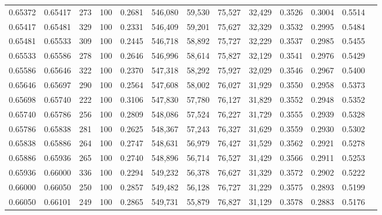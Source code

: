 \begin{tabular}{rrrrrrrrrrrrr}
0.65372 & 0.65417 &   273 & 100 &                                     0.2681 & 546,080 &  59,530 &  75,527 &  32,429 & 0.3526 & 0.3004 & 0.5514 \\
0.65417 & 0.65481 &   329 & 100 &                                     0.2331 & 546,409 &  59,201 &  75,627 &  32,329 & 0.3532 & 0.2995 & 0.5484 \\
0.65481 & 0.65533 &   309 & 100 &                                     0.2445 & 546,718 &  58,892 &  75,727 &  32,229 & 0.3537 & 0.2985 & 0.5455 \\
0.65533 & 0.65586 &   278 & 100 &                                     0.2646 & 546,996 &  58,614 &  75,827 &  32,129 & 0.3541 & 0.2976 & 0.5429 \\
0.65586 & 0.65646 &   322 & 100 &                                     0.2370 & 547,318 &  58,292 &  75,927 &  32,029 & 0.3546 & 0.2967 & 0.5400 \\
0.65646 & 0.65697 &   290 & 100 &                                     0.2564 & 547,608 &  58,002 &  76,027 &  31,929 & 0.3550 & 0.2958 & 0.5373 \\
0.65698 & 0.65740 &   222 & 100 &                                     0.3106 & 547,830 &  57,780 &  76,127 &  31,829 & 0.3552 & 0.2948 & 0.5352 \\
0.65740 & 0.65786 &   256 & 100 &                                     0.2809 & 548,086 &  57,524 &  76,227 &  31,729 & 0.3555 & 0.2939 & 0.5328 \\
0.65786 & 0.65838 &   281 & 100 &                                     0.2625 & 548,367 &  57,243 &  76,327 &  31,629 & 0.3559 & 0.2930 & 0.5302 \\
0.65838 & 0.65886 &   264 & 100 &                                     0.2747 & 548,631 &  56,979 &  76,427 &  31,529 & 0.3562 & 0.2921 & 0.5278 \\
0.65886 & 0.65936 &   265 & 100 &                                     0.2740 & 548,896 &  56,714 &  76,527 &  31,429 & 0.3566 & 0.2911 & 0.5253 \\
0.65936 & 0.66000 &   336 & 100 &                                     0.2294 & 549,232 &  56,378 &  76,627 &  31,329 & 0.3572 & 0.2902 & 0.5222 \\
0.66000 & 0.66050 &   250 & 100 &                                     0.2857 & 549,482 &  56,128 &  76,727 &  31,229 & 0.3575 & 0.2893 & 0.5199 \\
0.66050 & 0.66101 &   249 & 100 &                                     0.2865 & 549,731 &  55,879 &  76,827 &  31,129 & 0.3578 & 0.2883 & 0.5176 \\

\end{tabular}
